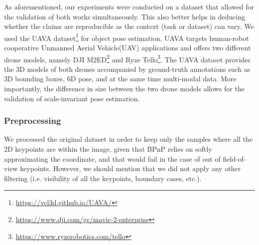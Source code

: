 As aforementioned, our experiments were conducted on a dataset that allowed for the validation of both works simultaneously.
This also better helps in deducing whether the claims are reproducible as the context (task or dataset) can vary. 
We used the UAVA dataset\footnote{\url{https://vcl3d.github.io/UAVA/}} for object pose estimation. 
UAVA targets human-robot cooperative Unmanned Aerial Vehicle(UAV) applications and offers two different drone models, namely DJI M2ED\footnote{\url{https://www.dji.com/gr/mavic-2-enterprise}} and Ryze Tello\footnote{\url{https://www.ryzerobotics.com/tello}}.
The UAVA dataset provides the 3D models of both drones accompanied by ground-truth annotations such as 3D bounding boxes, 6D pose, and at the same time multi-modal data.
More importantly, the difference in size between the two drone models allows for the validation of scale-invariant pose estimation.


\subsubsection{Preprocessing}
We processed the original dataset in order to keep only the samples where all the 2D keypoints are within the image, given that BPnP relies on softly approximating the coordinate, and that would fail in the case of out of field-of-view keypoints.
However, we should mention that we did not apply any other filtering (i.e. visibility of all the keypoints, boundary cases, etc.).

